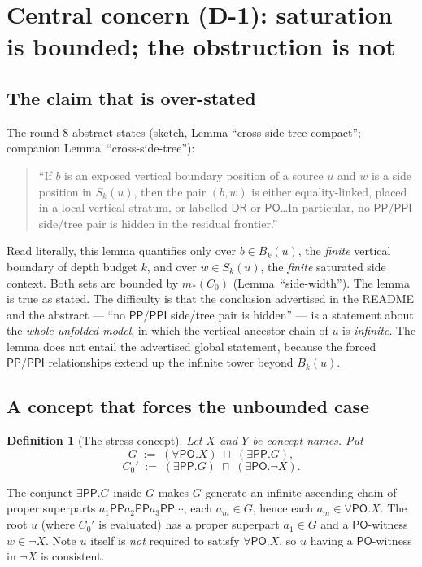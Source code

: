 \documentclass[11pt]{article}
\newtheorem{definition}[theorem]{Definition}
\newcommand{\DR}{\mathsf{DR}}
\newcommand{\PO}{\mathsf{PO}}
\newcommand{\PP}{\mathsf{PP}}
\newcommand{\PPI}{\mathsf{PPI}}
\begin{document}
\section{Central concern (D-1): saturation is bounded; the obstruction is not}
\label{sec:central}

\subsection{The claim that is over-stated}

The round-8 abstract states (sketch, Lemma ``cross-side-tree-compact''; companion
Lemma~``cross-side-tree''):
\begin{quote}
``If $b$ is an exposed vertical boundary position of a source $u$ and $w$ is a
side position in $S_k(u)$, then the pair $(b,w)$ is either equality-linked,
placed in a local vertical stratum, or labelled $\DR$ or $\PO$\ldots In
particular, no $\PP/\PPI$ side/tree pair is hidden in the residual frontier.''
\end{quote}
Read literally, this lemma quantifies only over $b\in B_k(u)$, the
\emph{finite} vertical boundary of depth budget $k$, and over $w\in S_k(u)$, the
\emph{finite} saturated side context.  Both sets are bounded by
$m_*(C_0)$ (Lemma~``side-width'').  The lemma is true as stated.  The difficulty
is that the conclusion advertised in the README and the abstract --- ``no
$\PP/\PPI$ side/tree pair is hidden'' --- is a statement about the \emph{whole
unfolded model}, in which the vertical ancestor chain of $u$ is \emph{infinite}.
The lemma does not entail the advertised global statement, because the forced
$\PP/\PPI$ relationships extend up the infinite tower beyond $B_k(u)$.

\subsection{A concept that forces the unbounded case}

\begin{definition}[The stress concept]
Let $X$ and $Y$ be concept names.  Put
\[
  G \;:=\; (\forall\PO.X)\;\sqcap\;(\exists\PP.G),
\]
\[
  C_0' \;:=\; (\exists\PP.G)\;\sqcap\;(\exists\PO.\neg X).
\]
\end{definition}
The conjunct $\exists\PP.G$ inside $G$ makes $G$ generate an infinite ascending
chain of proper superparts $a_1\PP a_2\PP a_3\PP\cdots$, each $a_m\in G$, hence
each $a_m\in\forall\PO.X$.  The root $u$ (where $C_0'$ is evaluated) has a proper
superpart $a_1\in G$ and a $\PO$-witness $w\in\neg X$.  Note $u$ itself is
\emph{not} required to satisfy $\forall\PO.X$, so $u$ having a $\PO$-witness in
$\neg X$ is consistent.
\end{document}
